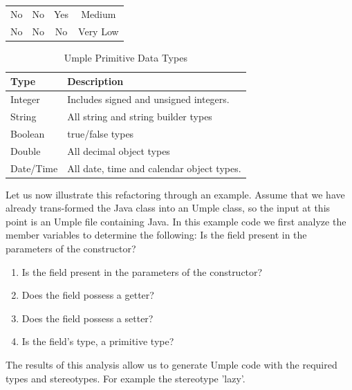 \begin{table}[h]
\begin{tabular}{@{}cccc@{}}
No                                                      & No                                                 & Yes                                                & Medium                                                                                                        \\
No                                                      & No                                                 & No                                                 & Very Low                                                                                                      \\ \bottomrule
\end{tabular}
\end{table}



\begin{table}
\caption{Umple Primitive Data Types}
\label{table:attributes2}
\centering
    \begin{tabular}{ll}
		\toprule
		\rowcolor[HTML]{BBDAFF}
        \textbf{Type}      & \textbf{Description}                               \\ 
        \hline
        Integer   & Includes signed and unsigned integers.    \\ 
        String    & All string and string builder types       \\ 
        Boolean   & true/false types                          \\ 
        Double    & All decimal object types                  \\ 
        Date/Time & All date, time and calendar object types. \\
        \hline
    \end{tabular}
\end{table}


Let us now illustrate this refactoring through an example. Assume that we have already trans-formed the Java class into an Umple class, so the input at this point is an Umple file containing Java. 
In this example code we first analyze the member variables to determine the following: 
Is the field present in the parameters of the constructor?
\begin{enumerate}
\item Is the field present in the parameters of the constructor?
\item Does the field possess a getter?
\item Does the field possess a setter?
\item Is the field's type, a primitive type?
\end{enumerate}
The results of this analysis allow us to generate Umple code with the required types and stereotypes. For example the stereotype 'lazy'.

